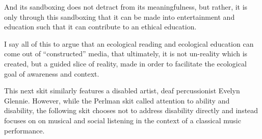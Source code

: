 \documentclass[12pt,letterpaper]{article}
\begin{document}
	And its sandboxing does not detract from its meaningfulness, but rather,
	it is only through this sandboxing that it can be made into 
	entertainment and
	education such that it can contribute to an ethical education. 
	
	I say all of this to argue that an ecological reading and ecological 
	education 
	can come out of ``constructed'' media, that ultimately, it is not 
	un-reality which is created, but a guided slice of reality, made in 
	order to facilitate the ecological goal of awareness and context.  
	
	This next skit similarly features a disabled artist, deaf percussionist 
	Evelyn Glennie. However, while the Perlman skit called attention to
	ability and disability, the following skit chooses not to address 
	disability directly and instead focuses on 
	on musical and social listening in the context of a classical music
	performance. 
	
\end{document}
